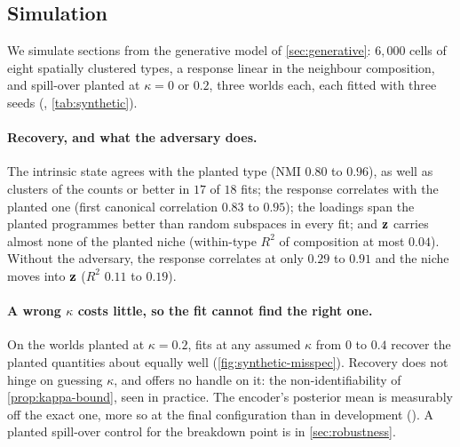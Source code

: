 \subsection{Simulation}
\label{sec:simulation}

We simulate sections from the generative model of \cref{sec:generative}: $6{,}000$ cells of eight spatially clustered types, a response linear in the neighbour composition, and spill-over planted at $\kappa = 0$ or $0.2$, three worlds each, each fitted with three seeds (, \cref{tab:synthetic}).

\paragraph{Recovery, and what the adversary does.}
The intrinsic state agrees with the planted type (NMI $0.80$ to $0.96$), as well as clusters of the counts or better in $17$ of $18$ fits; the response correlates with the planted one (first canonical correlation $0.83$ to $0.95$); the loadings span the planted programmes better than random subspaces in every fit; and $\mathbf{z}$ carries almost none of the planted niche (within-type $R^2$ of composition at most $0.04$). Without the adversary, the response correlates at only $0.29$ to $0.91$ and the niche moves into $\mathbf{z}$ ($R^2$ $0.11$ to $0.19$).

\paragraph{A wrong $\kappa$ costs little, so the fit cannot find the right one.}
On the worlds planted at $\kappa = 0.2$, fits at any assumed $\kappa$ from $0$ to $0.4$ recover the planted quantities about equally well (\cref{fig:synthetic-misspec}). Recovery does not hinge on guessing $\kappa$, and offers no handle on it: the non-identifiability of \cref{prop:kappa-bound}, seen in practice. The encoder's posterior mean is measurably off the exact one, more so at the final configuration than in development (). A planted spill-over control for the breakdown point is in \cref{sec:robustness}.
